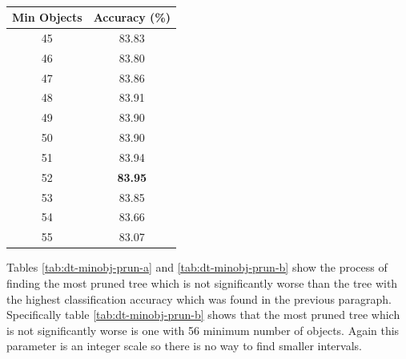 \documentclass[12pt]{article}
\begin{document}
\begin{table}[H]
\begin{subtable}{.5\linewidth}
          \caption{}
          \begin{tabular}{c|c}
            \toprule
            \multicolumn{1}{l|}{Min Objects} & \multicolumn{1}{l}{Accuracy (\%)} \\
            \midrule
            45    & 83.83 \\
            46    & 83.80 \\
            47    & 83.86 \\
            48    & 83.91 \\
            49    & 83.90 \\
            50    & 83.90 \\
            51    & 83.94 \\
            52    & \textbf{83.95} \\
            53    & 83.85 \\
            54    & 83.66 \\
            55    & 83.07 \\
            \bottomrule
            \end{tabular}
          \label{tab:dt-minobj-b}
        \end{subtable}
        \label{tab:dt-minobj}
      \end{table}

      Tables \ref{tab:dt-minobj-prun-a} and \ref{tab:dt-minobj-prun-b} show the process of finding the most pruned tree which is not significantly worse than the tree with the highest classification accuracy which was found in the previous paragraph. Specifically table \ref{tab:dt-minobj-prun-b} shows that the most pruned tree which is not significantly worse is one with 56 minimum number of objects. Again this parameter is an integer scale so there is no way to find smaller intervals.
\end{document}

